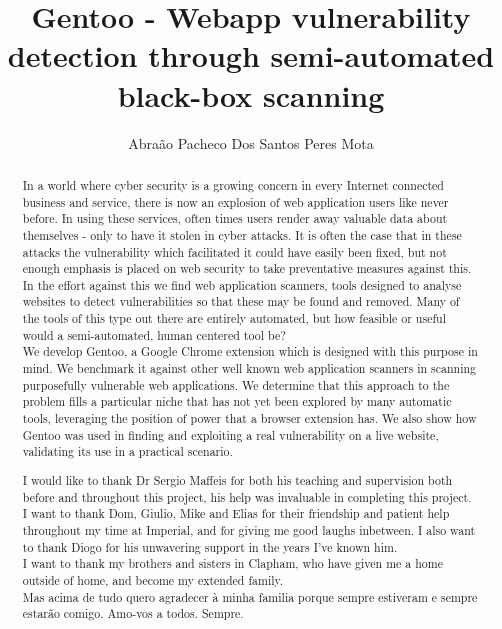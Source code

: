 \documentclass[a4paper, twoside]{report}
\title{Gentoo - Webapp vulnerability detection through semi-automated black-box scanning}
\author{Abra\~{a}o Pacheco Dos Santos Peres Mota}
\begin{document}


\clearpage{\pagestyle{fancy}\cleardoublepage}
\begin{abstract}
In a world where cyber security is a growing concern in every Internet connected business and service, there is now an explosion of web application users like never before. In using these services, often times users render away valuable data about themselves - only to have it stolen in cyber attacks. It is often the case that in these attacks the vulnerability which facilitated it could have easily been fixed, but not enough emphasis is placed on web security to take preventative measures against this. \\

In the effort against this we find web application scanners, tools designed to analyse websites to detect vulnerabilities so that these may be found and removed. Many of the tools of this type out there are entirely automated, but how feasible or useful would a semi-automated, human centered tool be? \\

We develop Gentoo, a Google Chrome extension which is designed with this purpose in mind. We benchmark it against other well known web application scanners in scanning purposefully vulnerable web applications. We determine that this approach to the problem fills a particular niche that has not yet been explored by many automatic tools, leveraging the position of power that a browser extension has. We also show how Gentoo was used in finding and exploiting a real vulnerability on a live website, validating its use in a practical scenario.
\end{abstract}


\clearpage{\pagestyle{fancy}\cleardoublepage}

\renewcommand{\abstractname}{Acknowledgements}
\begin{abstract}
	
I would like to thank Dr Sergio Maffeis for both his teaching and supervision both before and throughout this project, his help was invaluable in completing this project. \\

I want to thank Dom, Giulio, Mike and Elias for their friendship and patient help throughout my time at Imperial, and for giving me good laughs inbetween. I also want to thank Diogo for his unwavering support in the years I've known him. \\

I want to thank my brothers and sisters in Clapham, who have given me a home outside of home, and become my extended family. \\

\vspace{25mm}
Mas acima de tudo quero agradecer \`a minha familia porque sempre estiveram e sempre estar\~ao comigo. Amo-vos a todos. Sempre.
\end{abstract}
\end{document}
